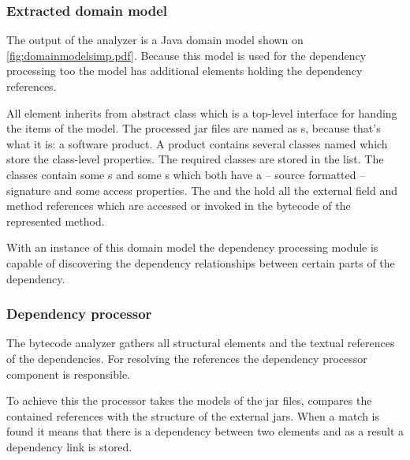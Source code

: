 \subsubsection{Extracted domain model}
The output of the analyzer is a Java domain model shown on
\autoref{fig:domainmodelsimp.pdf}. Because this model is used for the
dependency processing too the model has additional elements holding the
dependency references.

All element inherits from abstract  class which is a top-level
interface for handing the items of the model. The processed jar files are named
as s, because that's what it is: a software product. A product
contains several classes named  which store the class-level
properties. The required classes are stored in the 
list. The classes contain some s and some s which both
have a -- source formatted -- signature and some access properties. The
 and the  hold all the external
field and method references which are accessed or invoked in the bytecode of the
represented method.

With an instance of this domain model the dependency processing module is
capable of discovering the dependency relationships between certain parts of the
dependency.
 

\subsubsection{Dependency processor}
The bytecode analyzer gathers all structural elements and the textual references
of the dependencies. For resolving the references the dependency processor
component is responsible.

To achieve this the processor takes the models of the jar files, compares the
contained references with the structure of the external jars. When a match is
found it means that there is a dependency between two elements and as a result
a dependency link is stored.

